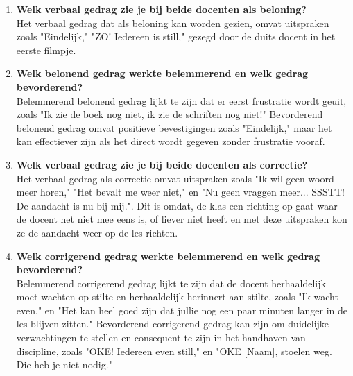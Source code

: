 \documentclass{article}
\begin{document}
        \begin{enumerate}[label=(\alph*)]
            \item \textbf{Welk verbaal gedrag zie je bij beide docenten als beloning?} \\
                Het verbaal gedrag dat als beloning kan worden gezien, omvat 
                uitspraken zoals "Eindelijk," "ZO! Iedereen is still," gezegd door
                de duits docent in het eerste filmpje.
            \item \textbf{Welk belonend gedrag werkte belemmerend en welk gedrag bevorderend?} \\
                Belemmerend belonend gedrag lijkt te zijn dat er eerst frustratie 
                wordt geuit, zoals "Ik zie de boek nog niet, ik zie de schriften nog
                niet!" Bevorderend belonend gedrag omvat positieve bevestigingen 
                zoals "Eindelijk," maar het kan effectiever zijn als het direct 
                wordt gegeven zonder frustratie vooraf.
            \item \textbf{Welk verbaal gedrag zie je bij beide docenten als correctie?} \\
                Het verbaal gedrag als correctie omvat uitspraken zoals "Ik wil geen
                woord meer horen," "Het bevalt me weer niet," en "Nu geen vraggen 
                meer... SSSTT! De aandacht is nu bij mij.". Dit is omdat, de klas 
                een richting op gaat waar de docent het niet mee eens is, of liever
                niet heeft en met deze uitspraken kon ze de aandacht weer op de les
                richten.
            \item \textbf{Welk corrigerend gedrag werkte belemmerend en welk gedrag bevorderend?} \\
                Belemmerend corrigerend gedrag lijkt te zijn dat de docent 
                herhaaldelijk moet wachten op stilte en herhaaldelijk herinnert aan 
                stilte, zoals "Ik wacht even," en "Het kan heel goed zijn dat jullie
                nog een paar minuten langer in de les blijven zitten." Bevorderend 
                corrigerend gedrag kan zijn om duidelijke verwachtingen te stellen 
                en consequent te zijn in het handhaven van discipline, zoals "OKE! 
                Iedereen even still," en "OKE [Naam], stoelen weg. Die heb je niet 
                nodig."
        \end{enumerate}
    \newpage
\end{document}
